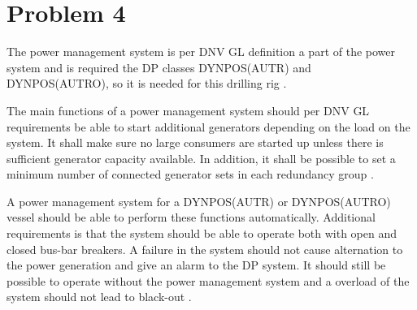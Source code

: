 \section*{Problem 4}
The power management system is per DNV GL definition a part of the power system and is required the DP classes DYNPOS(AUTR) and DYNPOS(AUTRO), so it is needed for this drilling rig \cite{RulesShipsDNVGLPart6Chap3}. 

The main functions of a power management system should per DNV GL requirements be able to start additional generators depending on the load on the system. It shall make sure no large consumers are started up unless there is sufficient generator capacity available. In addition, it shall be possible to set a minimum number of connected generator sets in each redundancy group \cite{RulesShipsDNVGLPart6Chap3}. 

A power management system for a DYNPOS(AUTR) or DYNPOS(AUTRO) vessel should be able to perform these functions automatically. Additional requirements is that the system should be able to operate both with open and closed bus-bar breakers. A failure in the system should not cause alternation to the power generation and give an alarm to the DP system. It should still be possible to operate without the power management system and a overload of the system should not lead to black-out \cite{RulesShipsDNVGLPart6Chap3}. 




    




